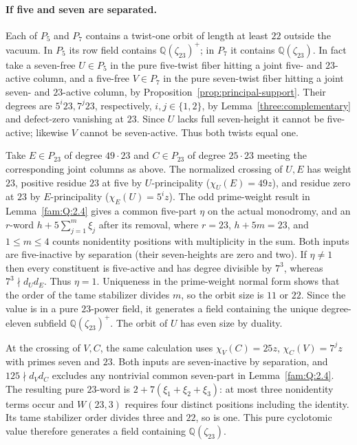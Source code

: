 \documentclass[11pt,a4paper]{article}
\numberwithin{equation}{section}
\theoremstyle{remark}
\begin{document}
\paragraph{If five and seven are separated.}
Each of $P_5$ and $P_7$ contains a twist-one orbit of length at
least $22$ outside the vacuum. In $P_5$ its row field contains
$\mathbb Q(\zeta_{23})^+$; in $P_7$ it contains $\mathbb Q(\zeta_{23})$.
In fact take a seven-free $U\in P_5$ in the pure five-twist fiber
hitting a joint five- and $23$-active column, and a five-free
$V\in P_7$ in the pure seven-twist fiber hitting a joint seven-
and $23$-active column, by Proposition~\ref{prop:principal-support}. Their degrees
are $5^i23,7^j23$, respectively, $i,j\in\{1,2\}$, by Lemma~\ref{three:complementary} and defect-zero vanishing at $23$. Since $U$ lacks
full seven-height it cannot be five-active; likewise $V$ cannot
be seven-active. Thus both twists equal one.

Take $E\in P_{23}$ of degree $49\cdot23$ and $C\in P_{23}$ of
degree $25\cdot23$ meeting the corresponding joint columns as
above. The normalized crossing of $U,E$ has weight $23$, positive
residue $23$ at five by $U$-principality ($\chi_U(E)=49 z$),
and residue zero at $23$ by $E$-principality
($\chi_E(U)=5^i z$). The odd prime-weight result in Lemma~\ref{fam:Q:2.4}
gives a common five-part $\eta$ on the actual monodromy, and an
$r$-word $h+5\sum_{j=1}^m\xi_j$ after its removal, where $r=23$,
$h+5m=23$, and $1\le m\le4$ counts nonidentity positions with
multiplicity in the sum. Both inputs are five-inactive by separation
(their seven-heights are zero and two). If $\eta\ne1$ then every
constituent is five-active and has degree divisible by $7^3$,
whereas $7^3\nmid d_Ud_E$. Thus $\eta=1$. Uniqueness in the
prime-weight normal form shows that the order of the tame
stabilizer divides $m$, so the orbit size is $11$ or $22$.
Since the value is in a pure $23$-power field, it generates a
field containing the unique degree-eleven subfield
$\mathbb Q(\zeta_{23})^+$. The orbit of $U$ has even size by duality.

At the crossing of $V,C$, the same calculation uses
$\chi_V(C)=25z$, $\chi_C(V)=7^jz$ with primes seven and $23$.
Both inputs are seven-inactive by separation, and
$125\nmid d_Vd_C$ excludes any nontrivial common seven-part in
Lemma~\ref{fam:Q:2.4}. The resulting pure $23$-word is
$2+7(\xi_1+\xi_2+\xi_3)$: at most three nonidentity terms occur
and $W(23,3)$ requires four distinct positions including the
identity. Its tame stabilizer order divides three and $22$, so is
one. This pure cyclotomic value therefore generates a field
containing $\mathbb Q(\zeta_{23})$.
\end{document}
